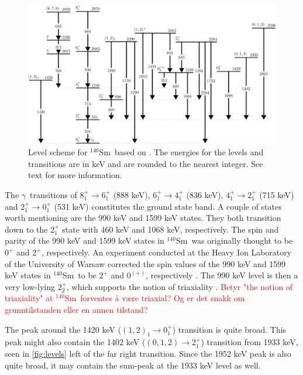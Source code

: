 \documentclass[twoside,english]{uiofysmaster/uiofysmaster}
\newcommand{\Sm}{$^{140}$Sm} %
\newcommand{\ga}{$\gamma$}
\let\orgautoref\autoref
\renewcommand{\autoref}
        {%
		 \def\sectionautorefname{Section}%
		 \def\subsectionautorefname{Section}%
		 \def\subsubsectionautorefname{Section}%
		 \def\chapterautorefname{Chapter}%
          \orgautoref}
\begin{document}
\begin{figure}[htb!]
	\centering
	\includegraphics[width=\textwidth]{Images/Level-scheme-140Sm-v2.png}
	\caption{Level scheme for \Sm\ based on \cite{Klintefjord, NNDC-levels}. 
	The energies for the levels and transitions are in keV and are rounded to the nearest integer.
	See text for more information.}
	\label{fig:levels}
\end{figure}


The \ga\ transitions of $8_1^+ \rightarrow 6_1^+$ (888 keV), $6_1^+ \rightarrow 4_1^+$ (836 keV), $4_1^+ \rightarrow 2_1^+$ (715 keV) and $2_1^+ \rightarrow 0_1^+$ (531 keV) constitutes the ground state band.
A couple of states worth mentioning are the 990 keV and 1599 keV states.
They both transition down to the $2_1^+$ state with 460 keV and 1068 keV, respectively.
The spin and parity of the 990 keV \cite{Firestone} and 1599 keV states in \Sm\ was originally thought to be $0^+$ and $2^+$, respectively. 
An experiment conducted at the Heavy Ion Laboratory of the University of Warsaw corrected the spin values of the 990 keV and 1599 keV states in \Sm\ to be $2^+$ and $0^{(+)}$, respectively \cite{Klintefjord2015, Samorajczyk2015}.
The 990 keV level is then a very low-lying $2_2^+$, which supports the notion of triaxiality \cite{Klintefjord2016}.
\textcolor{red}{Betyr "the notion of triaxiality" at \Sm\ forventes å være triaxial? Og er det snakk om grunntilstanden eller en annen tilstand?}

The peak around the 1420 keV ($(1,2)_1 \rightarrow 0_1^+$) transition is quite broad. 
This peak might also contain the 1402 keV ($(0,1,2) \rightarrow 2_1^+$) transition from 1933 keV, seen in \autoref{fig:levels} left of the far right transition. 
Since the 1952 keV peak is also quite broad, it may contain the sum-peak at the 1933 keV level as well.
\end{document}
